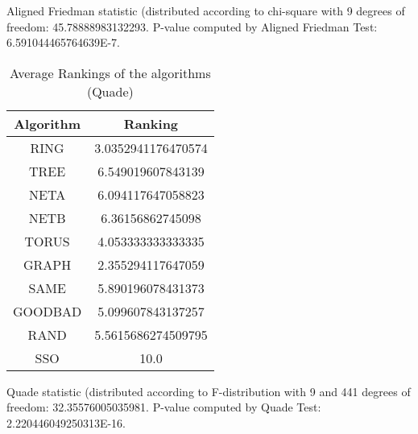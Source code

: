 \documentclass[a4paper,10pt]{article}
\begin{document}
\begin{landscape}
Aligned Friedman statistic (distributed according to chi-square with 9 degrees of freedom: 45.78888983132293. 
P-value computed by Aligned Friedman Test: 6.591044465764639E-7.\newline


\newpage

\begin{table}[!htp]
\centering
\caption{Average Rankings of the algorithms (Quade)
}\begin{tabular}{c|c}
Algorithm&Ranking\\
\hline
 RING&3.0352941176470574\\
 TREE&6.549019607843139\\
 NETA&6.094117647058823\\
 NETB&6.36156862745098\\
 TORUS&4.053333333333335\\
 GRAPH&2.355294117647059\\
 SAME&5.890196078431373\\
 GOODBAD&5.099607843137257\\
 RAND&5.5615686274509795\\
 SSO&10.0\\
\end{tabular}
\end{table}
Quade statistic (distributed according to F-distribution with 9 and 441 degrees of freedom: 32.35576005035981. 
P-value computed by Quade Test: 2.220446049250313E-16.\newline


\newpage


\end{landscape}
\end{document}
